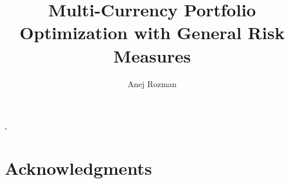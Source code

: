 \documentclass[11pt,a4paper,oneside]{memoir}
\title{Multi-Currency Portfolio Optimization with General Risk
Measures}
\author{Anej Rozman}
\date{}
\begin{document}
\frontmatter  

\begin{titlingpage} 
  \calccentering{\unitlength}
  \begin{adjustwidth*}{\unitlength-24pt}{-\unitlength-24pt}  
    \maketitle
  \end{adjustwidth*}
\end{titlingpage}

\chapter*{Acknowledgments}

\pagebreak

  

\cleartorecto 
\tableofcontents
\mainmatter

\newpage



 
  



\appendix
\appendixpage




\backmatter
 




\end{document}
